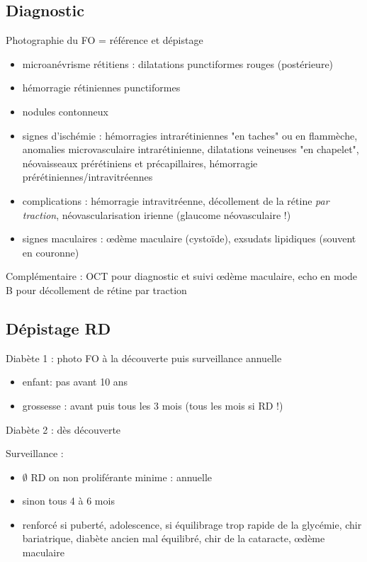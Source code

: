 \documentclass[11pt]{article}
\begin{document}
\subsection{Diagnostic}
\label{sec:orgd42f3ec}
Photographie du FO = référence et dépistage
\begin{itemize}
\item microanévrisme rétitiens : dilatations punctiformes rouges (postérieure)
\item hémorragie rétiniennes punctiformes
\item nodules contonneux
\item signes d'ischémie : hémorragies intrarétiniennes "en taches" ou en flammèche, anomalies
microvasculaire intrarétinienne, dilatations veineuses "en chapelet",
néovaisseaux prérétiniens et précapillaires, hémorragie prérétiniennes/intravitréennes
\item complications : hémorragie intravitréenne, décollement de la rétine \emph{par
traction}, néovascularisation irienne (\thus glaucome néovasculaire !)
\item signes maculaires : \oe{}dème maculaire (cystoïde), exsudats lipidiques
(souvent en couronne)
\end{itemize}

Complémentaire : OCT pour diagnostic et suivi \oe{}dème maculaire, echo en mode B
pour décollement de rétine par traction

\subsection{Dépistage RD}
\label{sec:org90212e5}
Diabète 1 : photo FO à la découverte puis surveillance annuelle
\begin{itemize}
\item enfant: pas avant 10 ans
\item grossesse : avant puis tous les 3 mois (tous les mois si RD !)
\end{itemize}
Diabète 2 : dès découverte

Surveillance :
\begin{itemize}
\item \(\emptyset\) RD on non proliférante minime : annuelle
\item sinon tous 4 à 6 mois
\item renforcé si puberté, adolescence, si équilibrage trop rapide de la glycémie,
chir bariatrique, diabète ancien mal équilibré, chir de la cataracte,
\oe{}dème maculaire
\end{itemize}
\end{document}
